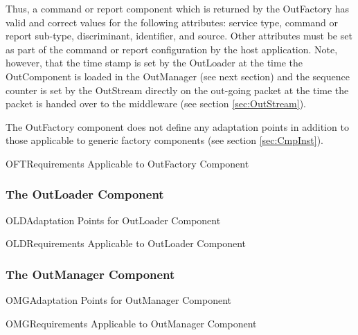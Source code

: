 \documentclass[a4paper,10pt]{article}
\newenvironment{cr_req}[2]
{%
\begin{longtable}{|l|p{9.8cm}|}
\caption{#2} \\
\hline
\rowcolor{light-gray}
\textbf{Req. ID} & \textbf{Requirement Text}\\
\hline\hline
\endfirsthead
\rowcolor{light-gray}
\textbf{Req. ID} & \textbf{Requirement Text}\\
\hline\hline
\endhead
\DTLforeach*[\DTLiseq{\cat}{#1}]{dbReq}{\cat=Category,\type=Type,\id=Id,\reqText=Text}
{\DTLiffirstrow{}{\\\hline}\cat-\id/\type & \textit{\reqText}}\\\hline
}
{\end{longtable}}
\newenvironment{cr_ap}[2]
{%
\begin{longtable}{|l|p{4.7cm}|p{4.9cm}|}
\caption{#2} \\
\hline
\rowcolor{light-gray}
\textbf{AP ID} & \textbf{Adaptation Point} & \textbf{Default Value}\\
\hline\hline
\endfirsthead
\rowcolor{light-gray}
\textbf{AP ID} & \textbf{Adaptation Point} & \textbf{Default Value}\\
\hline\hline
\endhead
\DTLforeach*[\DTLiseq{\cat}{#1}]{dbAP}{\cat=Category,\id=Id,\ap=AP,\defValue=DefValue}
{\DTLiffirstrow{}{\\\hline}\cat-\id & \ap & \defValue}\\\hline
}
{\end{longtable}}
\begin{document}
Thus, a command or report component which is returned by the OutFactory has valid and correct values for the following attributes: service type, command or report sub-type,  discriminant,  identifier, and source. Other attributes must be set as part of the command or report configuration by the host application. Note, however, that the time stamp is set by the OutLoader at the time the OutComponent is loaded in the OutManager (see next section) and the sequence counter is set by the OutStream directly on the out-going packet at the time the packet is handed over to the middleware (see section \ref{sec:OutStream}).

The OutFactory component does not define any adaptation points in addition to those applicable to generic factory components (see section \ref{sec:CmpInst}). 

\begin{cr_req}{OFT}{Requirements Applicable to OutFactory Component}
\end{cr_req}

\subsubsection{The OutLoader Component}\label{sec:OutLoader}


\begin{cr_ap}{OLD}{Adaptation Points for OutLoader Component}
\end{cr_ap}

\begin{cr_req}{OLD}{Requirements Applicable to OutLoader Component}
\end{cr_req}

\newpage
\subsubsection{The OutManager Component}\label{sec:OutManager}


\begin{cr_ap}{OMG}{Adaptation Points for OutManager Component}
\end{cr_ap}

\begin{cr_req}{OMG}{Requirements Applicable to OutManager Component}
\end{cr_req}
\end{document}
